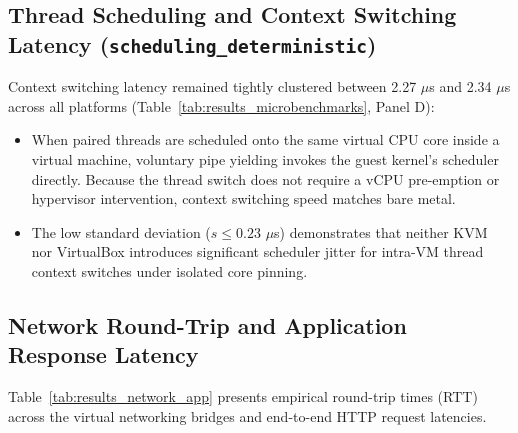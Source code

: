 \subsection{Thread Scheduling and Context Switching Latency (\texttt{scheduling\_deterministic})}
\label{subsec:results_scheduling}

Context switching latency remained tightly clustered between 2.27 $\mu$s and 2.34 $\mu$s across all platforms (Table~\ref{tab:results_microbenchmarks}, Panel D):
\begin{itemize}
    \item When paired threads are scheduled onto the same virtual CPU core inside a virtual machine, voluntary pipe yielding invokes the guest kernel's scheduler directly. Because the thread switch does not require a vCPU pre-emption or hypervisor intervention, context switching speed matches bare metal.
    \item The low standard deviation ($s \le 0.23$ $\mu$s) demonstrates that neither KVM nor VirtualBox introduces significant scheduler jitter for intra-VM thread context switches under isolated core pinning.
\end{itemize}

\subsection{Network Round-Trip and Application Response Latency}
\label{subsec:results_network_app}

Table~\ref{tab:results_network_app} presents empirical round-trip times (RTT) across the virtual networking bridges and end-to-end HTTP request latencies.

